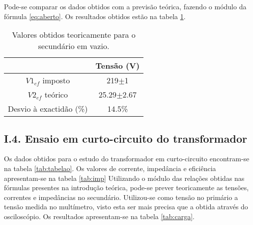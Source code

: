 \documentclass[%
  reprint,
  nofootinbib,
  amsmath,amssymb,
  aps,
  10pt,
]{revtex4-1}
\begin{document}


Pode-se comparar os dados obtidos com a previsão teórica, fazendo o módulo da fórmula \ref{eq:aberto}. Os resultados obtidos estão na tabela \ref{tab:vazio}.
\begin{table}[h]
\begin{tabular}{|c|c|}
                       & Tensão (V)     \\ \hline
$V1_{ef}$  imposto     & 219$\pm$1      \\
$V2_{ef}$ teórico      & 25.29$\pm$2.67 \\
Desvio à exactidão (\%) & 14.5\%        
\end{tabular}
\caption{Valores obtidos teoricamente para o secundário em vazio.}
\label{tab:vazio}
\end{table}

\subsection*{I.4. Ensaio em curto-circuito do transformador}
Os dados obtidos para o estudo do transformador em curto-circuito encontram-se na tabela \ref{tab:tabelao}. Os valores de corrente, impedância e eficiência apresentam-se na tabela \ref{tab:imp} Utilizando o módulo das relações obtidas nas fórmulas presentes na introdução teórica, pode-se prever teoricamente as tensões, correntes e impedâncias no secundário. Utilizou-se como tensão no primário a tensão medida no multímetro, visto esta ser mais precisa que a obtida através do osciloscópio. Os resultados apresentam-se na tabela \ref{tab:carga}.
\end{document}
